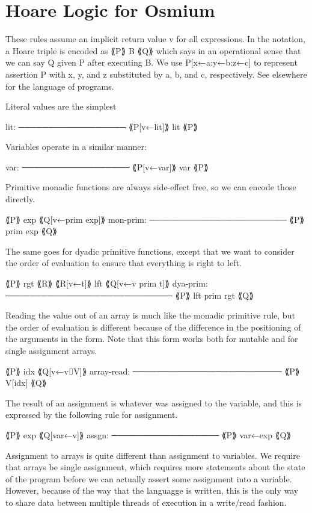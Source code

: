 \section{Hoare Logic for Osmium}

These rules assume an implicit return value v for all expressions.  In the
notation, a Hoare triple is encoded as ⟪P⟫ B ⟪Q⟫ which says in
an operational sense that we can say Q given P after executing B.  We use
P[x←a:y←b:z←c] to represent assertion P with x, y, and z substituted
by a, b, and c, respectively. See elsewhere for the language of programs.

Literal values are the simplest

lit: ──────────────────
     ⟪P[v←lit]⟫ lit ⟪P⟫

Variables operate in a similar manner:

var: ──────────────────
     ⟪P[v←var]⟫ var ⟪P⟫

Primitive monadic functions are always side-effect free, so we can 
encode those directly.

          ⟪P⟫ exp ⟪Q[v←prim exp]⟫
mon-prim: ───────────────────────
          ⟪P⟫ prim exp ⟪Q⟫

The same goes for dyadic primitive functions, except that we want 
to consider the order of evaluation to ensure that everything is 
right to left.

          ⟪P⟫ rgt ⟪R⟫
          ⟪R[v←t]⟫ lft ⟪Q[v←v prim t]⟫
dya-prim: ────────────────────────────
          ⟪P⟫ lft prim rgt ⟪Q⟫
          
Reading the value out of an array is much like the monadic 
primitive rule, but the order of evaluation is different because 
of the difference in the positioning of the arguments in the form. Note that
this form works both for mutable and for single assignment arrays.

            ⟪P⟫ idx ⟪Q[v←v⌷V]⟫
array-read: ─────────────────────────
            ⟪P⟫ V[idx] ⟪Q⟫

The result of an assignment is whatever was assigned to the variable, 
and this is expressed by the following rule for assignment.

       ⟪P⟫ exp ⟪Q[var←v]⟫
assgn: ──────────────────
       ⟪P⟫ var←exp ⟪Q⟫

Assignment to arrays is quite different than assignment to variables.
We require that arrays be single assignment, which requires more statements
about the state of the program before we can actually assert some assignment
into a variable. However, because of the way that the languagge is written,
this is the only way to share data between multiple threads of execution in
a write/read fashion.

